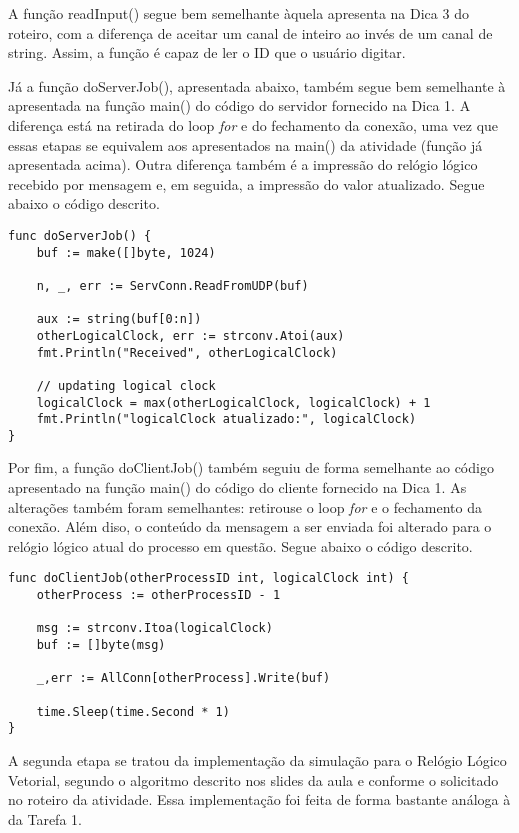 \documentclass[conference]{IEEEtran}
\begin{document}
	A função readInput() segue bem semelhante àquela apresenta na Dica 3 do roteiro, com a diferença de aceitar um canal de inteiro ao invés de um canal de string. Assim, a função é capaz de ler o ID que o usuário digitar.
	
	Já a função doServerJob(), apresentada abaixo, também segue bem semelhante à apresentada na função main() do código do servidor fornecido na Dica 1. A diferença está na retirada do loop \textit{for} e do fechamento da conexão, uma vez que essas etapas se equivalem aos apresentados na main() da atividade (função já apresentada acima). Outra diferença também é a impressão do relógio lógico recebido por mensagem e, em seguida, a impressão do valor atualizado. Segue abaixo o código descrito.

\begin{lstlisting}
func doServerJob() {
	buf := make([]byte, 1024)

	n, _, err := ServConn.ReadFromUDP(buf)

	aux := string(buf[0:n])
	otherLogicalClock, err := strconv.Atoi(aux)
	fmt.Println("Received", otherLogicalClock)
	
	// updating logical clock
	logicalClock = max(otherLogicalClock, logicalClock) + 1
	fmt.Println("logicalClock atualizado:", logicalClock)
}
\end{lstlisting}

	Por fim, a função doClientJob() também seguiu de forma semelhante ao código apresentado na função main() do código do cliente fornecido na Dica 1. As alterações também foram semelhantes: retirouse o loop \textit{for} e o fechamento da conexão. Além diso, o conteúdo da mensagem a ser enviada foi alterado para o relógio lógico atual do processo em questão. Segue abaixo o código descrito.

\begin{lstlisting}
func doClientJob(otherProcessID int, logicalClock int) {
	otherProcess := otherProcessID - 1

	msg := strconv.Itoa(logicalClock)
	buf := []byte(msg)

	_,err := AllConn[otherProcess].Write(buf)

	time.Sleep(time.Second * 1)
}
\end{lstlisting}

	A segunda etapa se tratou da implementação da simulação para o Relógio Lógico Vetorial, segundo o algoritmo descrito nos slides da aula e conforme o solicitado no roteiro da atividade. Essa implementação foi feita de forma bastante análoga à da Tarefa 1.
	
\end{document}
